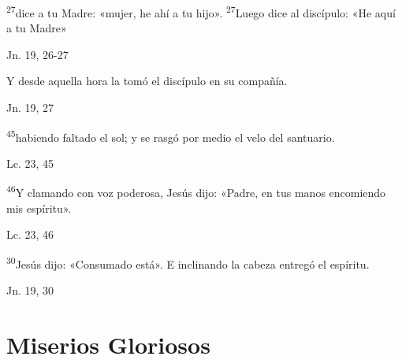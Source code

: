 \documentclass[a4paper,11pt]{article}
\begin{document}
      \textsuperscript{27}dice a tu Madre: «mujer, he ahí a tu hijo». \textsuperscript{27}Luego dice al discípulo: «He aquí a tu Madre»
      \begin{flushright}
        Jn. 19, 26-27
      \end{flushright}

      Y desde aquella hora la tomó el discípulo en su compañía.
      \begin{flushright}
        Jn. 19, 27
      \end{flushright}

      \textsuperscript{45}habiendo faltado el sol; y se rasgó por medio el velo del santuario.
      \begin{flushright}
        Lc. 23, 45
      \end{flushright}

      \textsuperscript{46}Y clamando con voz poderosa, Jesús dijo: «Padre, en tus manos encomiendo mis espíritu».
      \begin{flushright}
        Lc. 23, 46 
      \end{flushright}

      \textsuperscript{30}Jesús dijo: «Consumado está». E inclinando la cabeza entregó el espíritu.
      \begin{flushright}
        Jn. 19, 30
      \end{flushright}
 
    \newpage
         
  \section*{\hfil Miserios Gloriosos \hfil}
\end{document}

